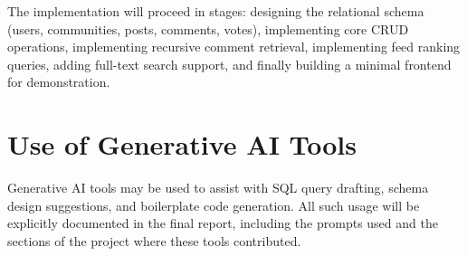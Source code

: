 \documentclass[11pt,a4paper]{article}
\begin{document}
The implementation will proceed in stages: designing the relational schema (users, communities, posts, comments, votes), implementing core CRUD operations, implementing recursive comment retrieval, implementing feed ranking queries, adding full-text search support, and finally building a minimal frontend for demonstration.

\section*{Use of Generative AI Tools}

Generative AI tools may be used to assist with SQL query drafting, schema design suggestions, and boilerplate code generation. All such usage will be explicitly documented in the final report, including the prompts used and the sections of the project where these tools contributed.
\end{document}
